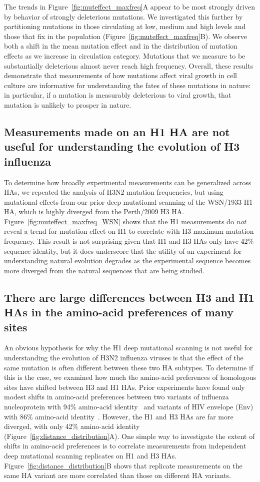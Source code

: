 \documentclass[9pt,twocolumn,twoside]{pnas-new}
\begin{document}
The trends in Figure~\ref{fig:muteffect_maxfreq}A appear to be most strongly driven by behavior of strongly deleterious mutations.
We investigated this further by partitioning mutations in those circulating at low, medium and high levels and those that fix in the population (Figure~\ref{fig:muteffect_maxfreq}B).
We observe both a shift in the mean mutation effect and in the distribution of mutation effects as we increase in circulation category.
Mutations that we measure to be substantially deleterious almost never reach high frequency.
Overall, these results demonstrate that measurements of how mutations affect viral growth in cell culture are informative for understanding the fates of these mutations in nature: in particular, if a mutation is measurably deleterious to viral growth, that mutation is unlikely to prosper in nature.

\subsection*{Measurements made on an H1 HA are not useful for understanding the evolution of H3 influenza}
To determine how broadly experimental measurements can be generalized across HAs, we repeated the analysis of H3N2 mutation frequencies, but using mutational effects from our prior deep mutational scanning of the WSN/1933 H1 HA, which is highly diverged from the Perth/2009 H3 HA.
Figure~\ref{fig:muteffect_maxfreq_WSN} shows that the H1 measurements do \textit{not} reveal a trend for mutation effect on H1 to correlate with H3 maximum mutation frequency.
This result is not surprising given that H1 and H3 HAs only have 42\% sequence identity, but it does underscore that the utility of an experiment for understanding natural evolution degrades as the experimental sequence becomes more diverged from the natural sequences that are being studied.

\subsection*{There are large differences between H3 and H1 HAs in the amino-acid preferences of many sites}
An obvious hypothesis for why the H1 deep mutational scanning is not useful for understanding the evolution of H3N2 influenza viruses is that the effect of the same mutation is often different between these two HA subtypes.
To determine if this is the case, we examined how much the amino-acid preferences of homologous sites have shifted between H3 and H1 HAs.
Prior experiments have found only modest shifts in amino-acid preferences between two variants of influenza nucleoprotein with 94\% amino-acid identity~\cite{doud2015site} and variants of HIV envelope (Env) with 86\% amino-acid identity~\cite{haddox2018mapping}.
However, the H1 and H3 HAs are far more diverged, with only 42\% amino-acid identity (Figure~\ref{fig:distance_distribution}A).
One simple way to investigate the extent of shifts in amino-acid preferences is to correlate measurements from independent deep mutational scanning replicates on H1 and H3 HAs.
Figure~\ref{fig:distance_distribution}B shows that replicate measurements on the same HA variant are more correlated than those on different HA variants.
\end{document}
